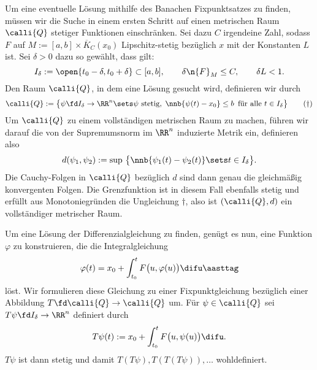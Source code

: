 \begin{antwort}
  \medskip\noindent
  Um eine eventuelle Lösung mithilfe des Banach\sch en Fixpunktsatzes 
  zu finden, müssen wir die Suche in einem 
  ersten Schritt auf einen   
  metrischen Raum $\calli{Q}$ stetiger Funktionen einschränken. 
  Sei dazu $C$ irgendeine Zahl, sodass 
  $F$ auf $M:=[a,b]\times \overline{K}_C (x_0)$ Lipschitz-stetig 
  bezüglich $x$ mit der Konstanten $L$ ist. 
  Sei $\delta > 0$ dazu so gewählt, dass gilt: 
  \[
  I_\delta := \open{ t_0-\delta, t_0+\delta } 
  \subset [a,b],\qquad
  \delta \n{ F }_M \le C, \qquad 
  \delta L < 1. 
  \]
  Den Raum $\calli{Q}$, in dem eine Lösung gesucht wird, definieren wir 
  durch 
  \[
  \calli{Q} := \big\{ 
  \psi \fd I_\delta\to\RR^n\sets \text{$\psi$ stetig}, \; 
  \nnb{ \psi(t)-x_0 } \le b \, \text{ für alle $t\in I_\delta$}
  \big\} 
  \tag{$\dagger$}
  \]
  Um $\calli{Q}$ zu einem vollständigen metrischen Raum zu 
  machen, führen wir darauf die von der Supremumsnorm im $\RR^n$ 
  induzierte Metrik ein, definieren also 
  \[
  d( \psi_1, \psi_2 ) := \sup \,\big\{ 
  \nnb{\psi_1(t)-\psi_2(t) } \sets t\in I_\delta \big\}.
  \]
  Die Cauchy-Folgen in $\calli{Q}$ bezüglich $d$ sind dann 
  genau die gleichmäßig konvergenten Folgen. Die Grenzfunktion 
  ist in diesem Fall ebenfalls 
  stetig und erfüllt aus Monotoniegründen 
  die Ungleichung $\dagger$, 
  also ist $(\calli{Q}, d )$ ein vollständiger metrischer Raum. 

  Um eine Lösung der Differenzialgleichung {\astref} zu finden, 
  genügt es nun, eine Funktion $\varphi$ zu konstruieren, die die 
  Integralgleichung  
  \[
  \varphi( t ) = x_0 + \int_{t_0}^t F\big(u, \varphi(u)\big) \difu
  \aasttag
  \]
  löst. Wir formulieren diese Gleichung zu einer 
  Fixpunktgleichung bezüglich einer Abbildung 
  $T \fd \calli{Q}\to\calli{Q}$ um. 
  Für $\psi \in\calli{Q}$ sei 
  $T\psi\fd I_\delta \to \RR^n$ definiert durch 
  \[
  T\psi(t) := x_0 + \int_{t_0}^t F\big( u, \psi(u) \big) \difu. 
  \]
  $T\psi$ ist dann stetig und damit $T(T\psi), T(T(T\psi)),\ldots$ 
  wohldefiniert.
  

\end{antwort}
